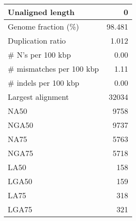 \documentclass[12pt,a4paper]{article}
\begin{document}
\begin{table}[ht]
\begin{center}
\begin{tabular}{|l*{1}{|r}|}
Unaligned length & 0 \\ \hline
Genome fraction (\%) & 98.481 \\ \hline
Duplication ratio & 1.012 \\ \hline
\# N's per 100 kbp & 0.00 \\ \hline
\# mismatches per 100 kbp & 1.11 \\ \hline
\# indels per 100 kbp & 0.00 \\ \hline
Largest alignment & 32034 \\ \hline
NA50 & 9758 \\ \hline
NGA50 & 9737 \\ \hline
NA75 & 5763 \\ \hline
NGA75 & 5718 \\ \hline
LA50 & 158 \\ \hline
LGA50 & 159 \\ \hline
LA75 & 318 \\ \hline
LGA75 & 321 \\ \hline
\end{tabular}
\end{center}
\end{table}
\end{document}
